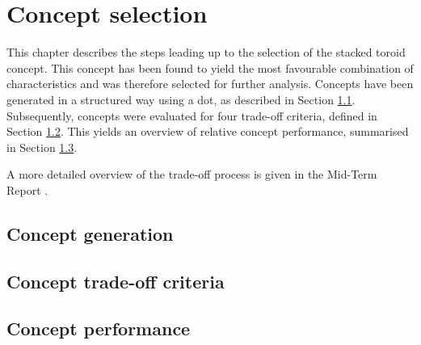 \section{Concept selection}\label{cha:conceptselection}
This chapter describes the steps leading up to the selection of the stacked toroid concept. This concept has been found to yield the most favourable combination of characteristics and was therefore selected for further analysis. Concepts have been generated in a structured way using a \gls{dot}, as described in Section \ref{sec:conceptgen}. Subsequently, concepts were evaluated for four trade-off criteria, defined in Section \ref{sec:conceptcriteria}. This yields an overview of relative concept performance, summarised in Section \ref{sec:conceptperf}.


A more detailed overview of the trade-off process is given in the Mid-Term Report \cite{Balasooriyan2015b}.

\subsection{Concept generation} \label{sec:conceptgen}


\subsection{Concept trade-off criteria} \label{sec:conceptcriteria}


\subsection{Concept performance} \label{sec:conceptperf}




